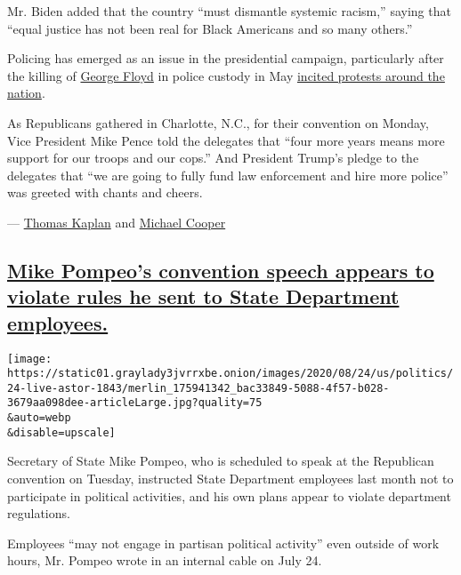 Mr. Biden added that the country ``must dismantle systemic racism,''
saying that ``equal justice has not been real for Black Americans and so
many others.''

Policing has emerged as an issue in the presidential campaign,
particularly after the killing of
\href{https://www.nytimes3xbfgragh.onion/article/george-floyd-who-is.html}{George
Floyd} in police custody in May
\href{https://www.nytimes3xbfgragh.onion/news-event/george-floyd-protests-minneapolis-new-york-los-angeles}{incited
protests around the nation}.

As Republicans gathered in Charlotte, N.C., for their convention on
Monday, Vice President Mike Pence told the delegates that ``four more
years means more support for our troops and our cops.'' And President
Trump's pledge to the delegates that ``we are going to fully fund law
enforcement and hire more police'' was greeted with chants and cheers.

--- \href{https://www.nytimes3xbfgragh.onion/by/thomas-kaplan}{Thomas
Kaplan} and
\href{https://www.nytimes3xbfgragh.onion/by/michael-cooper}{Michael
Cooper}

\hypertarget{mike-pompeos-convention-speech-appears-to-violate-rules-he-sent-to-state-department-employees}{%
\subsection{\texorpdfstring{\protect\hyperlink{mike-pompeos-convention-speech-appears-to-violate-rules-he-sent-to-state-department-employees}{Mike
Pompeo's convention speech appears to violate rules he sent to State
Department
employees.}}{Mike Pompeo's convention speech appears to violate rules he sent to State Department employees.}}\label{mike-pompeos-convention-speech-appears-to-violate-rules-he-sent-to-state-department-employees}}

\texttt{[image: https://static01.graylady3jvrrxbe.onion/images/2020/08/24/us/politics/24-live-astor-1843/merlin\_175941342\_bac33849-5088-4f57-b028-3679aa098dee-articleLarge.jpg?quality=75\\\&auto=webp\\\&disable=upscale]}

Secretary of State Mike Pompeo, who is scheduled to speak at the
Republican convention on Tuesday, instructed State Department employees
last month not to participate in political activities, and his own plans
appear to violate department regulations.

Employees ``may not engage in partisan political activity'' even outside
of work hours, Mr. Pompeo wrote in an internal cable on July 24.

